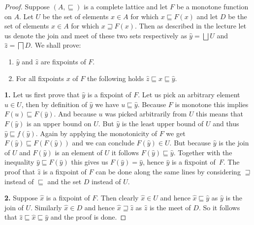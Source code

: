 \begin{proof}
    Suppose $(A,\sqsubseteq)$ is a complete lattice and let $F$ be a monotone function on $A.$ Let $U$ be the set of elements $x\in A$ for which $x\sqsubseteq F(x)$ and let $D$ be the set of elements $x\in A$ for which $x\sqsupseteq F(x).$ Then as described in the lecture let us denote the join and meet of these two sets respectively as $\hat{y}= \bigsqcup U$ and $\hat{z}=\bigsqcap D.$ We shall prove:
    \begin{enumerate}
        \item $\hat{y}$ and $\hat{z}$ are fixpoints of $F$.
        \item For all fixpoints $x$ of $F$ the following holds $\hat{z}\sqsubseteq x\sqsubseteq \hat{y}$.
    \end{enumerate}

    \bigskip\noindent
    {\bf 1.}
    Let us first prove that $\hat{y}$ is a fixpoint of $F.$ Let us pick an arbitrary element $u\in U$, then by definition of $\hat{y}$ we have $u\sqsubseteq \hat{y}.$ Because $F$ is monotone this implies $F(u)\sqsubseteq F(\hat{y}).$ And because $u$ was picked arbitrarily from $U$ this means that $F(\hat{y})$ is an upper bound on $U.$ But $\hat{y}$ is the least upper bound of $U$ and thus $\hat{y}\sqsubseteq f(\hat{y}).$ Again by applying the monotonicity of $F$ we get $F(\hat{y})\sqsubseteq F(F(\hat{y}))$ and we can conclude $F(\hat{y})\in U.$ But because $\hat{y}$ is the join of $U$ and $F(\hat{y})$ is an element of $U$ it follows $F(\hat{y})\sqsubseteq \hat{y}.$ Together with the inequality $\hat{y}\sqsubseteq F(\hat{y})$ this gives us $F(\hat{y})=\hat{y}$, hence $\hat{y}$ is a fixpoint of~$F$. The proof that $\hat{z}$ is a fixpoint of $F$ can be done along the same lines by considering $\sqsupseteq$ instead of $\sqsubseteq$ and the set $D$ instead of $U.$

    \bigskip\noindent
    {\bf 2.}
    Suppose $\hat{x}$ is a fixpoint of $F$. Then clearly $\hat{x}\in U$ and hence $\hat{x}\sqsubseteq \hat{y}$ as $\hat{y}$ is the join of $U.$ Similarly $\hat{x}\in D$ and hence $\hat{x}\sqsupseteq \hat{z}$ as $\hat{z}$ is the meet of $D.$ So it follows that $\hat{z}\sqsubseteq\hat{x}\sqsubseteq\hat{y}$ and the proof is done.
\end{proof}



